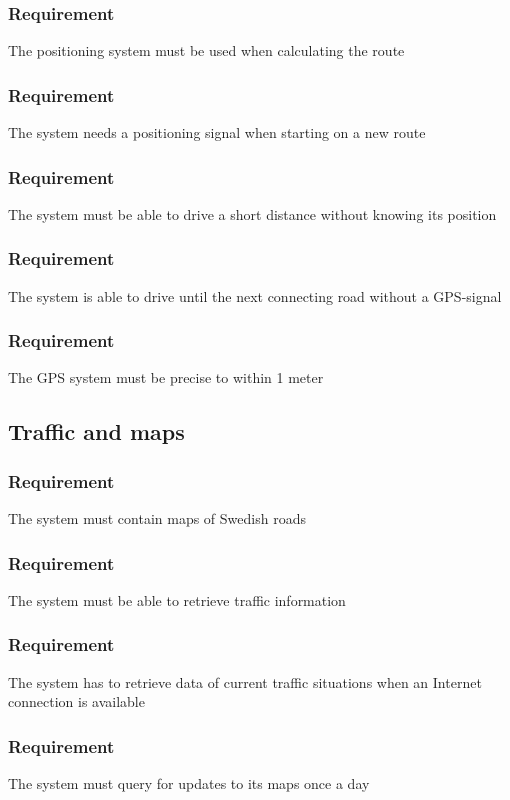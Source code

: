 \documentclass{article}
\begin{document}
{      \subsubsection{Requirement}
\hfill \break 
\- \- \-The positioning system must be used when calculating the route
      \subsubsection{Requirement}
\hfill \break 
\- \- \-The system needs a positioning signal when starting on a new route
      \subsubsection{Requirement}
\hfill \break 
\- \- \-The system must be able to drive a short distance without knowing its position
      \subsubsection{Requirement}
\hfill \break 
\- \- \-The system is able to drive until the next connecting road without a GPS-signal
      \subsubsection{Requirement}
\hfill \break 
\- \- \-The GPS system must be precise to within 1 meter
  \subsection{Traffic and maps}
      \subsubsection{Requirement}
\hfill \break 
\- \- \-The system must contain maps of Swedish roads
      \subsubsection{Requirement}
\hfill \break 
\- \- \-The system must be able to retrieve traffic information
      \subsubsection{Requirement}
\hfill \break 
\- \- \-The system has to retrieve data of current traffic situations when an Internet connection is available
      \subsubsection{Requirement}
\hfill \break 
\- \- \-The system must query for updates to its maps once a day
}
\end{document}
